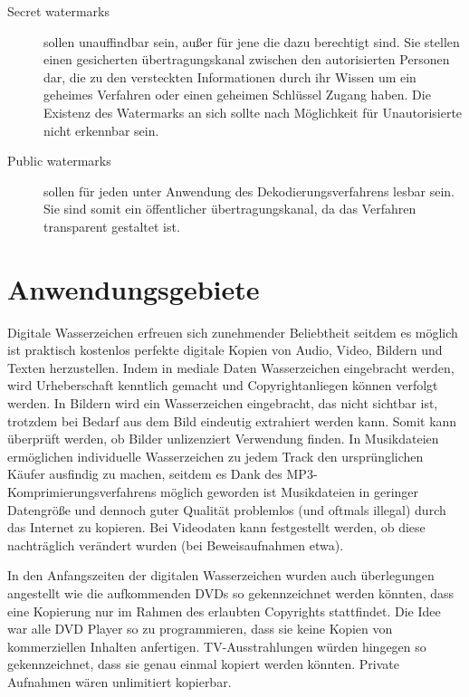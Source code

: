 \begin{description}
	
	\item[Secret watermarks] sollen unauffindbar sein, außer f\"ur jene die dazu berechtigt sind. Sie stellen einen gesicherten \"ubertragungskanal zwischen den autorisierten Personen dar, die zu den versteckten Informationen durch ihr Wissen um ein geheimes Verfahren oder einen geheimen Schl\"ussel Zugang haben. Die Existenz des Watermarks an sich sollte nach M\"oglichkeit f\"ur Unautorisierte nicht erkennbar sein. 
	
	\item[Public watermarks] sollen f\"ur jeden unter Anwendung des Dekodierungsverfahrens lesbar sein. Sie sind somit ein \"offentlicher \"ubertragungskanal, da das Verfahren transparent gestaltet ist.
	
\end{description}

\section{Anwendungsgebiete}

Digitale Wasserzeichen erfreuen sich zunehmender Beliebtheit seitdem es m\"oglich ist praktisch kostenlos perfekte digitale Kopien von Audio, Video, Bildern und Texten herzustellen\cite{mintzer1997effective}. Indem in mediale Daten Wasserzeichen eingebracht werden, wird Urheberschaft kenntlich gemacht und Copyrightanliegen k\"onnen verfolgt werden. In Bildern wird ein Wasserzeichen eingebracht, das nicht sichtbar ist, trotzdem bei Bedarf aus dem Bild eindeutig extrahiert werden kann. Somit kann \"uberpr\"uft werden, ob Bilder unlizenziert Verwendung finden. In Musikdateien erm\"oglichen individuelle Wasserzeichen zu jedem Track den urspr\"unglichen K\"aufer ausfindig zu machen, seitdem es Dank des MP3-Komprimierungsverfahrens m\"oglich geworden ist Musikdateien in geringer Datengr\"oße und dennoch guter Qualit\"at problemlos (und oftmals illegal) durch das Internet zu kopieren. Bei Videodaten kann festgestellt werden, ob diese nachtr\"aglich ver\"andert wurden (bei Beweisaufnahmen etwa). 

In den Anfangszeiten der digitalen Wasserzeichen wurden auch \"uberlegungen angestellt wie die aufkommenden DVDs so gekennzeichnet werden k\"onnten, dass eine Kopierung nur im Rahmen des erlaubten Copyrights stattfindet\cite{petitcolas1999information}. Die Idee war alle DVD Player so zu programmieren, dass sie keine Kopien von kommerziellen Inhalten anfertigen. TV-Ausstrahlungen w\"urden hingegen so gekennzeichnet, dass sie genau einmal kopiert werden k\"onnten. Private Aufnahmen w\"aren unlimitiert kopierbar. 

